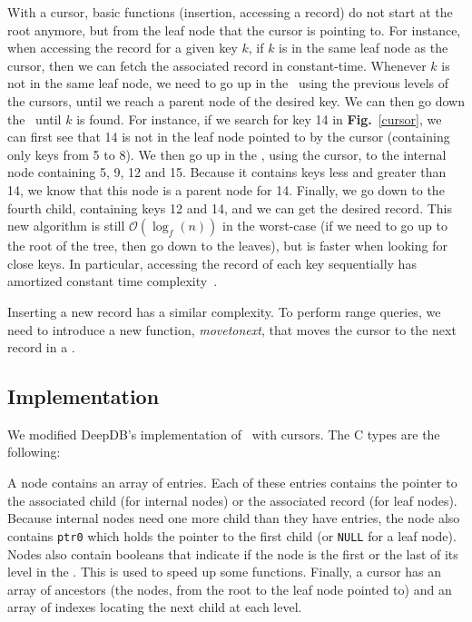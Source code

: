 \cursor

With a cursor, basic functions (insertion, accessing a record) do not start at the root anymore, but from the leaf node that the cursor is pointing to.
For instance, when accessing the record for a given key $k$, if $k$ is in the same leaf node as the cursor, then we can fetch the associated record in constant-time.
Whenever $k$ is not in the same leaf node, we need to go up in the \btree\ using the previous levels of the cursors, until we reach a parent node of the desired key.
We can then go down the \btree\ until $k$ is found.
For instance, if we search for key 14 in \textbf{Fig.}~\ref{cursor}, we can first see that 14 is not in the leaf node pointed to by the cursor (containing only keys from 5 to 8).
We then go up in the \btree, using the cursor, to the internal node containing 5, 9, 12 and 15.
Because it contains keys less and greater than 14, we know that this node is a parent node for 14.
Finally, we go down to the fourth child, containing keys 12 and 14, and we can get the desired record.
This new algorithm is still $\mathcal{O}(\log_{f}(n))$ in the worst-case (if we need to go up to the root of the tree, then go down to the leaves),
but is faster when looking for close keys.
In particular, accessing the record of each key sequentially has amortized constant time complexity~\cite{tosin}.

Inserting a new record has a similar complexity.
To perform range queries, we need to introduce a new function, \textit{movetonext}, that moves the cursor to the next record in a \btree.

\subsection{Implementation}
We modified DeepDB's implementation of \btrees\ with cursors. The C types are the following:

\begin{multicols}{2}

\end{multicols}

A node contains an array of entries.
Each of these entries contains the pointer to the associated child (for internal nodes) or the associated record (for leaf nodes).
Because internal nodes need one more child than they have entries, the node also contains \texttt{ptr0} which holds the pointer to the first child (or \texttt{NULL} for a leaf node).
Nodes also contain booleans that indicate if the node is the first or the last of its level in the \btree.
This is used to speed up some functions.
Finally, a cursor has an array of ancestors (the nodes, from the root to the leaf node pointed to) and an array of indexes locating the next child at each level.

